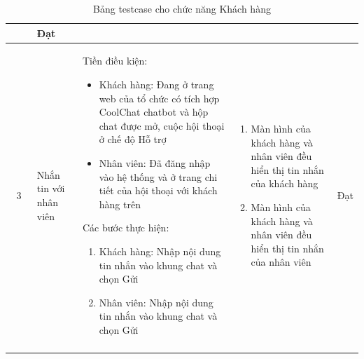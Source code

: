 \begin{longtable}{|c|m{2.5cm}|m{5.5cm}|m{4.5cm}|c|}
\begin{enumerate}[label=\arabic*.]
    \end{enumerate}& Đạt \\
    \hline
    3 & 
    Nhắn tin với nhân viên & 
    Tiền điều kiện:
    \begin{itemize}
        \item Khách hàng: Đang ở trang web của tổ chức có tích hợp CoolChat chatbot và hộp chat được mở, cuộc hội thoại ở chế độ Hỗ trợ
        \item Nhân viên: Đã đăng nhập vào hệ thống và ở trang chi tiết của hội thoại với khách hàng trên
    \end{itemize}
    Các bước thực hiện: 
    \begin{enumerate}[label=\arabic*.]
        \item Khách hàng: Nhập nội dung tin nhắn vào khung chat và chọn Gửi
        \item Nhân viên: Nhập nội dung tin nhắn vào khung chat và chọn Gửi
    \end{enumerate}
    & 
    \begin{enumerate}[label=\arabic*.]
        \item Màn hình của khách hàng và nhân viên đều hiển thị tin nhắn của khách hàng
        \item Màn hình của khách hàng và nhân viên đều hiển thị tin nhắn của nhân viên
    \end{enumerate}& Đạt \\
    \hline
    \caption{Bảng testcase cho chức năng Khách hàng}
\end{longtable}